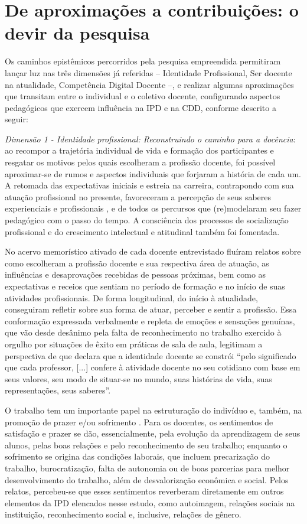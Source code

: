 \documentclass[portuguese]{textolivre}
\begin{document}
\section{De aproximações a contribuições: o devir da pesquisa}\label{sec-organizacao-latex}
Os caminhos epistêmicos percorridos pela pesquisa empreendida permitiram lançar luz nas três dimensões já referidas – Identidade Profissional, Ser docente na atualidade, Competência Digital Docente –, e realizar algumas aproximações que transitam entre o individual e o coletivo docente, configurando aspectos pedagógicos que exercem influência na IPD e na CDD, conforme descrito a seguir:

\textit{Dimensão 1 - Identidade profissional: Reconstruindo o caminho para a docência}: ao recompor a trajetória individual de vida e formação dos participantes e resgatar os motivos pelos quais escolheram a profissão docente, foi possível aproximar-se de rumos e aspectos individuais que forjaram a história de cada um. A retomada das expectativas iniciais e estreia na carreira, contrapondo com sua atuação profissional no presente, favoreceram a percepção de seus saberes experienciais e profissionais \cite{tardif2014}, e de todos os percursos que (re)modelaram seu fazer pedagógico com o passo do tempo. A consciência dos processos de socialização profissional \cite{dubar2012} e do crescimento intelectual e atitudinal também foi fomentada.

No acervo memorístico ativado de cada docente entrevistado fluíram relatos sobre como escolheram a profissão docente e sua respectiva área de atuação, as influências e desaprovações recebidas de pessoas próximas, bem como as expectativas e receios que sentiam no período de formação e no início de suas atividades profissionais. De forma longitudinal, do início à atualidade, conseguiram refletir sobre sua forma de atuar, perceber e sentir a profissão. Essa conformação expressada verbalmente e repleta de emoções e sensações genuínas, que vão desde desânimo pela falta de reconhecimento no trabalho exercido à orgulho por situações de êxito em práticas de sala de aula, legitimam a perspectiva de \textcite[p.~16]{pimenta1996} que declara que a identidade docente se constrói “pelo significado que cada professor, [...] confere à atividade docente no seu cotidiano com base em seus valores, seu modo de situar-se no mundo, suas histórias de vida, suas representações, seus saberes”.

O trabalho tem um importante papel na estruturação do indivíduo e, também, na promoção de prazer e/ou sofrimento \cite{codo1999}. Para os docentes, os sentimentos de satisfação e prazer se dão, essencialmente, pela evolução da aprendizagem de seus alunos, pelas boas relações e pelo reconhecimento de seu trabalho; enquanto o sofrimento se origina das condições laborais, que incluem precarização do trabalho, burocratização, falta de autonomia ou de boas parcerias para melhor desenvolvimento do trabalho, além de desvalorização econômica e social. Pelos relatos, percebeu-se que esses sentimentos reverberam diretamente em outros elementos da IPD elencados nesse estudo, como autoimagem, relações sociais na instituição, reconhecimento social e, inclusive, relações de gênero. 
\end{document}
